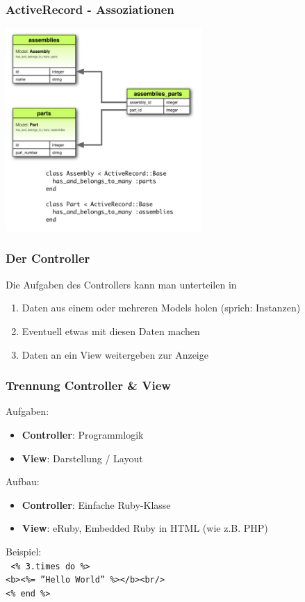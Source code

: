 \begin{frame}
  \frametitle{ActiveRecord - Assoziationen}
  \begin{center}
    \includegraphics[width=7.5cm]{img/habtm.png}
  \end{center}
\end{frame}

\begin{frame}
  \frametitle{Der Controller}
  Die Aufgaben des Controllers kann man unterteilen in
  \begin{enumerate}
    \item Daten aus einem oder mehreren Models holen (sprich: Instanzen)
    \item Eventuell etwas mit diesen Daten machen
    \item Daten an ein View weitergeben zur Anzeige
  \end{enumerate}
\end{frame}

\begin{frame}
  \frametitle{Trennung Controller \& View}
  Aufgaben: \\
  \begin{itemize}
    \item {\bf Controller}: Programmlogik
    \item {\bf View}: Darstellung / Layout
  \end{itemize}

  Aufbau: \\
  \begin{itemize}
    \item {\bf Controller}: Einfache Ruby-Klasse
    \item {\bf View}: eRuby, Embedded Ruby in HTML (wie z.B. PHP)
  \end{itemize}
  \pause
  Beispiel: \\
  \small \tt
  <\% 3.times do \%> \\
  \enskip <b><\%= ''Hello World'' \%></b><br/> \\
  <\% end \%>
\end{frame}

